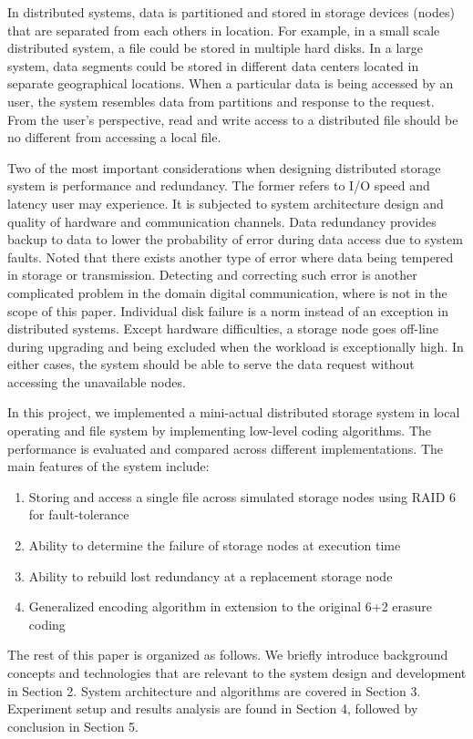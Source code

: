 In distributed systems, data is partitioned and stored in storage devices (nodes) that are separated from each others in location. For example, in a small scale distributed system, a file could be stored in multiple hard disks. In a large system, data segments could be stored in different data centers located in separate geographical locations. When a particular data is being accessed by an user, the system resembles data from partitions and response to the request. From the user's perspective, read and write access to a distributed file should be no different from accessing a local file.

Two of the most important considerations when designing distributed storage system is performance and redundancy. The former refers to I/O speed and latency user may experience. It is subjected to system architecture design and quality of hardware and communication channels. Data redundancy provides backup to data to lower the probability of error during data access due to system faults. Noted that there exists another type of error where data being tempered in storage or transmission. Detecting and correcting such error is another complicated problem in the domain digital communication, where is not in the scope of this paper.
Individual disk failure is a norm instead of an exception in distributed systems. Except hardware difficulties, a storage node goes off-line during upgrading and being excluded when the workload is exceptionally high. In either cases, the system should be able to serve the data request without accessing the unavailable nodes.

In this project, we implemented a mini-actual distributed storage system in local operating and file system by implementing low-level coding algorithms. The performance is evaluated and compared across different implementations. The main features of the system include: 

\begin{enumerate}
	\item Storing and access a single file across simulated storage nodes using RAID 6 for fault-tolerance
	
	\item Ability to determine the failure of storage nodes at execution time
	
	\item Ability to rebuild lost redundancy at a replacement storage node
	
	\item Generalized encoding algorithm in extension to the original 6+2 erasure coding
\end{enumerate}


The rest of this paper is organized as follows. We briefly introduce background concepts and technologies that are relevant to the system design and development in Section 2. System architecture and algorithms are covered in Section 3. Experiment setup and results analysis are found in Section 4, followed by conclusion in Section 5.
